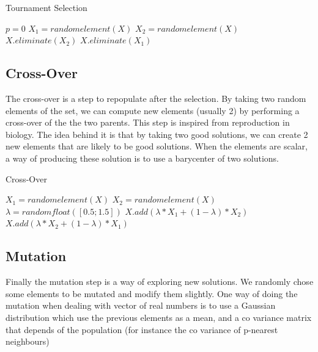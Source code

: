 \begin{algorithm}
    \caption{Tournament Selection}
    \begin{algorithmic}
    \STATE $ p = 0 $
            \STATE $ X_1 = random element(X) $ 
            \STATE $ X_2 = random element(X) $
                \STATE $X.eliminate(X_2)$
            \ELSE
                \STATE $X.eliminate(X_1)$
            \ENDIF
        \ENDWHILE
    
    \end{algorithmic}
\end{algorithm}

\subsection{Cross-Over}
    The cross-over is a step to repopulate after the selection. By taking two random elements of the set, we can compute new elements (usually 2) by performing a cross-over of the the two parents. This step is inspired from reproduction in biology. The idea behind it is that by taking two good solutions, we can create 2 new elements that are likely to be good solutions. When the elements are scalar, a way of producing these solution is to use a barycenter of two solutions. 

\begin{algorithm}
    \caption{Cross-Over}

    \begin{algorithmic}
            \STATE $X_1 = random element(X)$
            \STATE $X_2 = random element(X)$
            \STATE $\lambda = random float([0.5; 1.5])$
            \STATE $X.add (\lambda * X_1 + ( 1 - \lambda) * X_2)$
            \STATE $X.add (\lambda * X_2 + ( 1 - \lambda) * X_1)$
    \ENDFOR
    \end{algorithmic}
\end{algorithm}


\subsection{Mutation}
    Finally the mutation step is a way of exploring new solutions. We randomly chose some elements to be mutated and modify them slightly. One way of doing the mutation when dealing with vector of real numbers is to use a Gaussian distribution which use the previous elements as a mean, and a co variance matrix that depends of the population (for instance the co variance of p-nearest neighbours)


